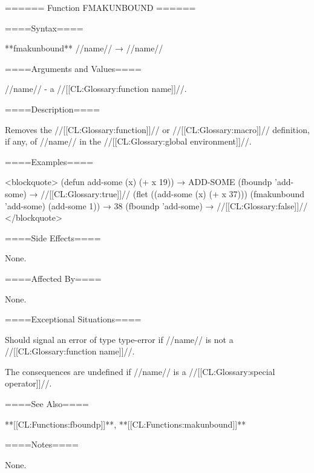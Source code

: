====== Function FMAKUNBOUND ======

====Syntax====

**fmakunbound** //name// → //name//

====Arguments and Values====

//name// - a //[[CL:Glossary:function name]]//.

====Description====

Removes the //[[CL:Glossary:function]]// or //[[CL:Glossary:macro]]// definition, if any, of //name// in the //[[CL:Glossary:global environment]]//.

====Examples====

<blockquote> (defun add-some (x) (+ x 19)) → ADD-SOME (fboundp 'add-some) → //[[CL:Glossary:true]]// (flet ((add-some (x) (+ x 37))) (fmakunbound 'add-some) (add-some 1)) → 38 (fboundp 'add-some) → //[[CL:Glossary:false]]// </blockquote>

====Side Effects====

None.

====Affected By====

None.

====Exceptional Situations====

Should signal an error of type type-error if //name// is not a //[[CL:Glossary:function name]]//.

The consequences are undefined if //name// is a //[[CL:Glossary:special operator]]//.

====See Also====

**[[CL:Functions:fboundp]]**, **[[CL:Functions:makunbound]]**

====Notes====

None.


